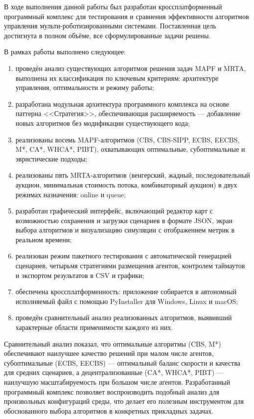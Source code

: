 \conclusion

В ходе выполнения данной работы был разработан кроссплатформенный программный комплекс для тестирования и сравнения эффективности алгоритмов управления мульти-роботизированными системами. Поставленная цель достигнута в полном объёме, все сформулированные задачи решены.

В рамках работы выполнено следующее:

\begin{enumerate}[arabic]
    \item проведён анализ существующих алгоритмов решения задач MAPF и MRTA, выполнена их классификация по ключевым критериям: архитектуре управления, оптимальности и режиму работы;
    \item разработана модульная архитектура программного комплекса на основе паттерна <<Стратегия>>, обеспечивающая расширяемость --- добавление новых алгоритмов без модификации существующего кода;
    \item реализованы восемь MAPF-алгоритмов (CBS, CBS-SIPP, ECBS, EECBS, M*, CA*, WHCA*, PIBT), охватывающих оптимальные, субоптимальные и эвристические подходы;
    \item реализованы пять MRTA-алгоритмов (венгерский, жадный, последовательный аукцион, минимальная стоимость потока, комбинаторный аукцион) в двух режимах назначения: online и queue;
    \item разработан графический интерфейс, включающий редактор карт с возможностью сохранения и загрузки сценариев в формате JSON, экран выбора алгоритмов и визуализацию симуляции с отображением метрик в реальном времени;
    \item реализован режим пакетного тестирования с автоматической генерацией сценариев, четырьмя стратегиями размещения агентов, контролем таймаутов и экспортом результатов в CSV и графики;
    \item обеспечена кроссплатформенность: приложение собирается в автономный исполняемый файл с помощью PyInstaller для Windows, Linux и macOS;
    \item проведён сравнительный анализ реализованных алгоритмов, выявивший характерные области применимости каждого из них.
\end{enumerate}

Сравнительный анализ показал, что оптимальные алгоритмы (CBS, M*) обеспечивают наилучшее качество решений при малом числе агентов, субоптимальные (ECBS, EECBS) --- оптимальный баланс скорости и качества для средних сценариев, а децентрализованные (CA*, WHCA*, PIBT) --- наилучшую масштабируемость при большом числе агентов. Разработанный программный комплекс позволяет воспроизводить подобный анализ для произвольных конфигураций среды, что делает его полезным инструментом для обоснованного выбора алгоритмов в конкретных прикладных задачах.
